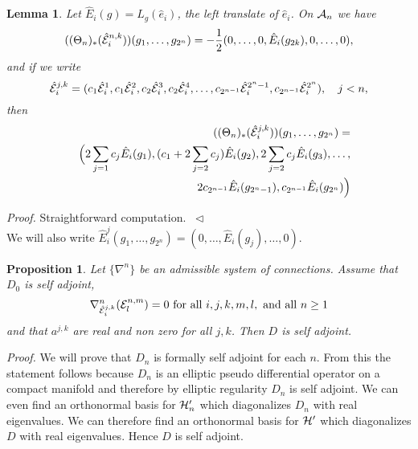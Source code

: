 \documentclass[12pt]{article}
\newcommand{\eproof}{{~\hfill$ \triangleleft$}}
\def\ca{{\cal A}}
\def\ce{{\cal E}}
\def\ch{{\cal H}}
\newtheorem{lemma}[thm]{Lemma}
\newtheorem{proposition}[thm]{Proposition}
\begin{document}
{\begin{lemma}  \label{grimt}
Let $ \hat{E}_i (g)=L_g(\hat{e}_i)$, the left translate of $\hat{e}_i$. On $\ca_{n}$ we have
$$((\Theta_{n})_* (\hat{\ce}_i^{n,k}))(g_1,\ldots ,g_{2^n})=-\frac{1}{2 }(0,\ldots,0, \hat{E}_i(g_{2k}),0,\ldots,0),$$
and if we write 
$$\hat{\ce}^{j,k}_i=(c_1\hat{\ce}_i^1,c_1\hat{\ce}_i^2,c_2\hat{\ce}_i^3,c_2\hat{\ce}_i^4,\ldots,c_{2^{n-1}}\hat{\ce}_i^{2^n-1},c_{2^{n-1}}\hat{\ce}_i^{2^n}), \quad j < n,$$
then
\begin{eqnarray*} &&\hspace{-2cm}
((\Theta_{n})_* (\hat{\ce}^{j,k}_i))(g_1,\ldots ,g_{2^n})=\\
&&
\Big( 2\sum_{j=1}c_j\hat{E}_i(g_1),(c_1+2\sum_{j=2}c_j)\hat{E}_i(g_2),2\sum_{j=2}c_j\hat{E}_i(g_3),\ldots ,\\
&& 2c_{2^{n-1}}\hat{E}_i(g_{2^n-1}),c_{2^{n-1}}\hat{E}_i(g_{2^n}) \Big)%
\end{eqnarray*}
\end{lemma}

\textit{Proof.} Straightforward computation. \eproof\\


We will also write $\hat{E}_i^j(g_1,\ldots,g_{2^n})=(0,\ldots, \hat{E}_i(g_j),\ldots,0)$.

\begin{proposition}\label{selv}
Let $\{\nabla^n\}$ be an admissible system of connections. Assume  that $D_0$ is self adjoint, 
$$\nabla^n_{\hat{\ce}_i^{j,k}} (\ce_l^{n,m})=0  \hbox{ for all }i,j,k,m,l,\hbox{ and  all } n\geq 1 $$
and that $a^{j,k}$ are real and non zero for all $j,k$.
Then $D$ is self adjoint.
\end{proposition}

\textit{Proof.} We will prove that $D_n$ is formally self adjoint for each $n$. From this the statement follows because $D_n$ is an elliptic pseudo differential operator on a compact manifold and therefore by elliptic regularity $D_n$ is self adjoint. We can even find an orthonormal basis for $\ch'_n$ which diagonalizes $D_n$ with real eigenvalues. We can therefore find an orthonormal basis for $\ch'$ which diagonalizes $D$ with real eigenvalues. Hence $D$ is self adjoint.

}
\end{document}
